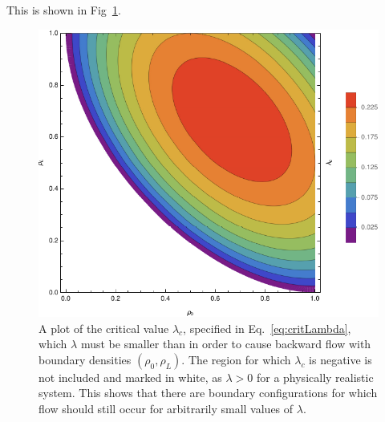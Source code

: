 This is shown in Fig~\ref{fig:critLambda}.
\begin{figure}[h!]
 \caption[The dependence of the critial value of $\lambda$ required for backward diffusion on the boundary conditions.]{\label{fig:critLambda} A plot of the critical value $\lambda_c$, specified in Eq.~\ref{eq:critLambda},
 which $\lambda$ must be smaller than in order to cause backward flow with boundary densities $(\rho_0, \rho_L)$. The region for which $\lambda_c$ is negative is not included and marked in white, as $\lambda>0$ for a physically
 realistic system. This shows that there are boundary configurations for which flow should still occur for arbitrarily small values of $\lambda$.}
 \includegraphics[width=0.99\linewidth]{analytics/images/criticalLambda}
\end{figure}

